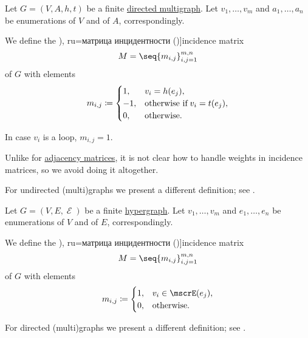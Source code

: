 \begin{definition}\label{def:directed_incidence_matrix}
  Let \( G = (V, A, h, t) \) be a finite \hyperref[def:directed_multigraph]{directed multigraph}. Let \( v_1, \ldots, v_m \) and \( a_1, \ldots, a_n \) be enumerations of \( V \) and of \( A \), correspondingly.

  We define the \term[bg=матрица на инцидентност (\cite[47]{Мирчев2001Графи}), ru=матрица инцидентности (\cite[289]{БелоусовТкачёв2004ДискретнаяМатематика})]{incidence matrix}
  \begin{equation*}
    M = \seq{ m_{i,j} }_{i,j=1}^{m,n}
  \end{equation*}
  of \( G \) with elements
  \begin{equation*}
    m_{i,j} \coloneqq \begin{cases}
      1,  &v_i = h(e_j), \\
      -1, &\T{otherwise if} v_i = t(e_j), \\
      0,  &\T{otherwise.}
    \end{cases}
  \end{equation*}

  In case \( v_i \) is a loop, \( m_{i,j} = 1 \).
\end{definition}
\begin{comments}
  \item Unlike for \hyperref[def:graph_adjacency_matrix]{adjacency matrices}, it is not clear how to handle weights in incidence matrices, so we avoid doing it altogether.
  \item For undirected (multi)graphs we present a different definition; see .
\end{comments}

\begin{definition}\label{def:undirected_incidence_matrix}
  Let \( G = (V, E, \mscrE) \) be a finite \hyperref[def:hypergraph]{hypergraph}. Let \( v_1, \ldots, v_m \) and \( e_1, \ldots, e_n \) be enumerations of \( V \) and of \( E \), correspondingly.

  We define the \term[bg=матрица на инцидентност (\cite[47]{Мирчев2001Графи}), ru=матрица инцидентности (\cite[288]{БелоусовТкачёв2004ДискретнаяМатематика})]{incidence matrix}
  \begin{equation*}
    M = \seq{ m_{i,j} }_{i,j=1}^{m,n}
  \end{equation*}
  of \( G \) with elements
  \begin{equation*}
    m_{i,j} \coloneqq \begin{cases}
      1,  &v_i \in \mscrE(e_j), \\
      0,  &\T{otherwise.}
    \end{cases}
  \end{equation*}
\end{definition}
\begin{comments}
  \item For directed (multi)graphs we present a different definition; see .
\end{comments}

